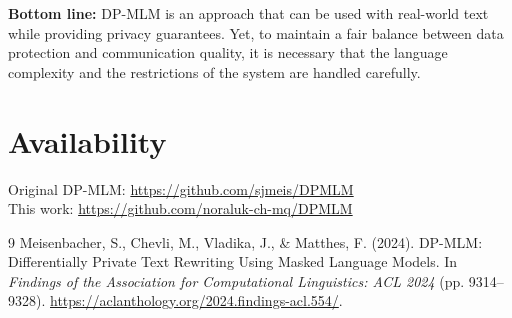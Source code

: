 \documentclass[11pt]{article}
\begin{document}
\textbf{Bottom line:} DP-MLM is an approach that can be used with real-world text while providing privacy guarantees. Yet, to maintain a fair balance between data protection and communication quality, it is necessary that the language complexity and the restrictions of the system are handled carefully.

\section*{Availability}
\noindent Original DP-MLM: \url{https://github.com/sjmeis/DPMLM}\\
\noindent This work: \url{https://github.com/noraluk-ch-mq/DPMLM}

\begin{thebibliography}{9}
Meisenbacher, S., Chevli, M., Vladika, J., \& Matthes, F. (2024). DP-MLM: Differentially Private Text Rewriting Using Masked Language Models. In \textit{Findings of the Association for Computational Linguistics: ACL 2024} (pp. 9314--9328). \url{https://aclanthology.org/2024.findings-acl.554/}.
\end{thebibliography}
\end{document}
